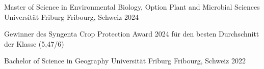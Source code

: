 

\begin{cventries}

  \cventry
    {Master of Science in Environmental Biology, Option Plant and Microbial Sciences} %
    {Universität Friburg} %
    {Fribourg, Schweiz} %
    {2024} %
    {
      \begin{cvitems} %
        \item {Gewinner des Syngenta Crop Protection Award 2024 für den besten Durchschnitt der Klasse (5,47/6)}
      \end{cvitems}
    }

  \cventry
    {Bachelor of Science in Geography} %
    {Universität Friburg} %
    {Fribourg, Schweiz} %
    {2022} %
    {}

\end{cventries}

